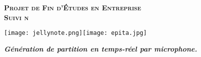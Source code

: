 \begin{titlepage}



	\begin{center}

		{
			\Huge
				\textsc{
					\textbf{
						Projet de Fin d'Études en Entreprise \\
					}
				}
		}
		{
			\LARGE
				\textsc{
					\textbf{
						Suivi n \\
					}
				}
		}

		{
				\texttt{[image: jellynote.png]}\hspace{3cm}\texttt{[image: epita.jpg]}\\
				[1cm]
		}

		\textbf{
			\textit {
				Génération de partition en temps-réel par microphone.\\
				[1cm]
			}
		}
	\end{center}
\end{titlepage}